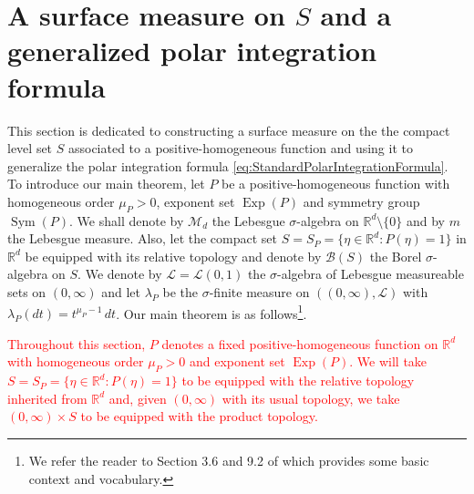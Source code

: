 \documentclass[11pt]{article}
\newcommand\Sym{\operatorname{Sym}}
\newcommand\Exp{\operatorname{Exp}}
\begin{document}
\section{A surface measure on $S$ and a generalized polar integration formula}\label{sec:IntegrationFormula}

This section is dedicated to constructing a surface measure on the the compact level set $S$ associated to a positive-homogeneous function and using it to generalize the polar integration formula \eqref{eq:StandardPolarIntegrationFormula}. To introduce our main theorem, let $P$ be a positive-homogeneous function with homogeneous order $\mu_P>0$, exponent set $\Exp(P)$ and symmetry group $\Sym(P)$. We shall denote by $\mathcal{M}_d$ the Lebesgue $\sigma$-algebra on $\mathbb{R}^d\setminus\{0\}$ and by $m$ the Lebesgue measure.  Also, let the compact set $S=S_P=\{\eta\in\mathbb{R}^d:P(\eta)=1\}$ in $\mathbb{R}^d$ be equipped with its relative topology and denote by $\mathcal{B}(S)$ the Borel $\sigma$-algebra on $S$. We denote by $\mathcal{L}=\mathcal{L}(0,1)$ the $\sigma$-algebra of Lebesgue measureable sets on $(0,\infty)$ and let $\lambda_P$ be the $\sigma$-finite measure on $((0,\infty),\mathcal{L})$ with $\lambda_P(dt)=t^{\mu_P-1}\,dt$. Our main theorem is as follows\footnote{We refer the reader to Section 3.6 and 9.2 of \cite{Bogachev2007} which provides some basic context and vocabulary.}. 

\textcolor{red}{\noindent Throughout this section, $P$ denotes a fixed positive-homogeneous function on $\mathbb{R}^d$ with homogeneous order $\mu_P>0$ and exponent set $\Exp(P)$. We will take $S=S_P=\{\eta\in\mathbb{R}^d:P(\eta)=1\}$ to be equipped with the relative topology inherited from $\mathbb{R}^d$ and, given $(0,\infty)$ with its usual topology, we take $(0,\infty)\times S$ to be equipped with the product topology. }
\end{document}
